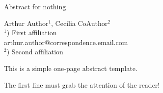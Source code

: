 \documentclass[a4paper]{article}
\begin{document}
\Large
 \begin{center}
Abstract for nothing\\ 

\hspace{10pt}

\large
Arthur Author$^1$, Cecilia CoAuthor$^2$ \\
\hspace{10pt}
\small  
$^1$) First affiliation\\
arthur.author@correspondence.email.com\\
$^2$) Second affiliation
\end{center} %

\hspace{10pt}
\normalsize
This is a simple one-page abstract template.

The first line must grab the attention of the reader!
\end{document}

